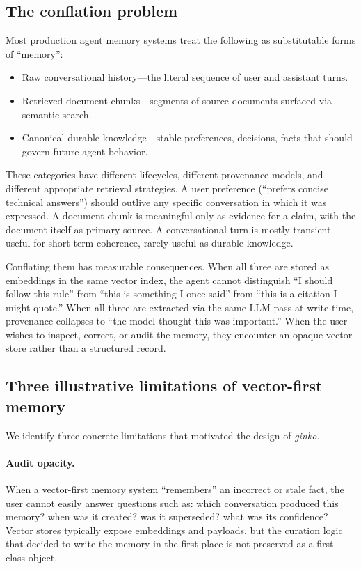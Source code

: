 \documentclass[11pt,a4paper]{article}
\begin{document}
\subsection{The conflation problem}

Most production agent memory systems treat the following as substitutable forms of ``memory'':

\begin{itemize}
 \item Raw conversational history---the literal sequence of user and assistant turns.
 \item Retrieved document chunks---segments of source documents surfaced via semantic search.
 \item Canonical durable knowledge---stable preferences, decisions, facts that should govern future agent behavior.
\end{itemize}

These categories have different lifecycles, different provenance models, and different appropriate retrieval strategies. A user preference (``prefers concise technical answers'') should outlive any specific conversation in which it was expressed. A document chunk is meaningful only as evidence for a claim, with the document itself as primary source. A conversational turn is mostly transient---useful for short-term coherence, rarely useful as durable knowledge.

Conflating them has measurable consequences. When all three are stored as embeddings in the same vector index, the agent cannot distinguish ``I should follow this rule'' from ``this is something I once said'' from ``this is a citation I might quote.'' When all three are extracted via the same LLM pass at write time, provenance collapses to ``the model thought this was important.'' When the user wishes to inspect, correct, or audit the memory, they encounter an opaque vector store rather than a structured record.

\subsection{Three illustrative limitations of vector-first memory}

We identify three concrete limitations that motivated the design of \textit{ginko}.

\paragraph{Audit opacity.} When a vector-first memory system ``remembers'' an incorrect or stale fact, the user cannot easily answer questions such as: which conversation produced this memory? when was it created? was it superseded? what was its confidence? Vector stores typically expose embeddings and payloads, but the curation logic that decided to write the memory in the first place is not preserved as a first-class object.
\end{document}
